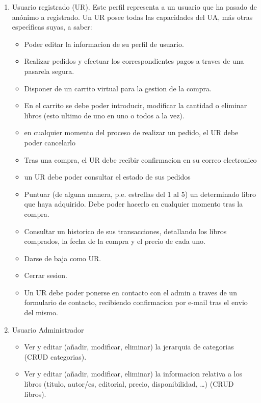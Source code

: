 \documentclass[a4paper]{report}
\begin{document}
\begin{enumerate}
\begin{itemize}
                \end{itemize}
                \item Usuario registrado (UR). Este perfil representa a un usuario que ha pasado de an\'onimo a registrado. Un UR posee todas las capacidades del UA, m\'as otras espec\'\i{}ficas suyas, a saber:
                \begin{itemize}
                    \item Poder editar la informacion de su perfil de usuario.
                    \item Realizar pedidos y efectuar los correspondientes pagos a traves de una pasarela segura.
                    \item Disponer de un carrito virtual para la gestion de la compra.
                    \item En el carrito se debe poder introducir, modificar la cantidad o eliminar libros (esto ultimo de uno en uno o todos a la vez).
                    \item en cualquier momento del proceso de realizar un pedido, el UR debe poder cancelarlo
                    \item Tras una compra, el UR debe recibir confirmacion en su correo electronico
                    \item un UR debe poder consultar el estado de sus pedidos
                    \item Puntuar (de alguna manera, p.e. estrellas del 1 al 5) un determinado libro que haya adquirido. Debe poder hacerlo en cualquier momento tras la compra.
                    \item Consultar un historico de sus transacciones, detallando los libros comprados, la fecha de la compra y el precio de cada uno.
                    \item Darse de baja como UR.
                    \item Cerrar sesion.
                    \item Un UR debe poder ponerse en contacto con el admin a traves de un formulario de contacto, recibiendo confirmacion por e-mail tras el envio del mismo.
                \end{itemize}
                \item Usuario Administrador
                \begin{itemize}
                    \item Ver y editar (a\~nadir, modificar, eliminar) la jerarquia de categorias (CRUD categorias).
                    \item Ver y editar (a\~nadir, modificar, eliminar) la informacion relativa a los libros (titulo, autor/es, editorial, precio, disponibilidad, \ldots) (CRUD libros).

\end{itemize}
\end{enumerate}
\end{document}
